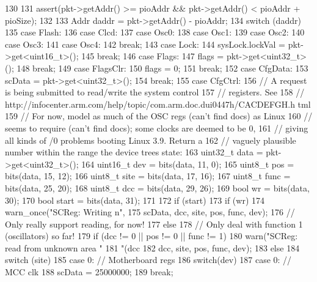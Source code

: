 \begin{DoxyCode}
130 {
131     assert(pkt->getAddr() >= pioAddr && pkt->getAddr() < pioAddr + pioSize);
132 
133     Addr daddr = pkt->getAddr() - pioAddr;
134     switch (daddr) {
135       case Flash:
136       case Clcd:
137       case Osc0:
138       case Osc1:
139       case Osc2:
140       case Osc3:
141       case Osc4:
142         break;
143       case Lock:
144         sysLock.lockVal = pkt->get<uint16_t>();
145         break;
146       case Flags:
147         flags = pkt->get<uint32_t>();
148         break;
149       case FlagsClr:
150         flags = 0;
151         break;
152       case CfgData:
153         scData = pkt->get<uint32_t>();
154         break;
155       case CfgCtrl: {
156           // A request is being submitted to read/write the system control
157           // registers.  See
158           // http://infocenter.arm.com/help/topic/com.arm.doc.dui0447h/CACDEFGH.h
      tml
159           // For now, model as much of the OSC regs (can't find docs) as Linux
160           // seems to require (can't find docs); some clocks are deemed to be 0,
161           // giving all kinds of /0 problems booting Linux 3.9.  Return a
162           // vaguely plausible number within the range the device trees state:
163           uint32_t data = pkt->get<uint32_t>();
164           uint16_t dev = bits(data, 11, 0);
165           uint8_t pos = bits(data, 15, 12);
166           uint8_t site = bits(data, 17, 16);
167           uint8_t func = bits(data, 25, 20);
168           uint8_t dcc = bits(data, 29, 26);
169           bool wr = bits(data, 30);
170           bool start = bits(data, 31);
171 
172           if (start) {
173               if (wr) {
174                   warn_once("SCReg: Writing %
      n",
175                           scData, dcc, site, pos, func, dev);
176                   // Only really support reading, for now!
177               } else {
178                   // Only deal with function 1 (oscillators) so far!
179                   if (dcc != 0 || pos != 0 || func != 1) {
180                       warn("SCReg: read from unknown area "
181                            "(dcc %
182                            dcc, site, pos, func, dev);
183                   } else {
184                       switch (site) {
185                         case 0: { // Motherboard regs
186                             switch(dev) {
187                               case 0: // MCC clk
188                                 scData = 25000000;
189                                 break;
}}}}}}}}}
\end{DoxyCode}
